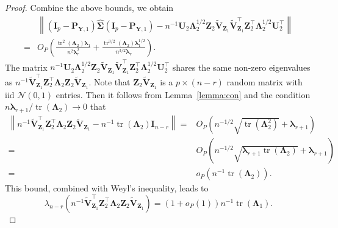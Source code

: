 \documentclass[12pt]{article} %
\DeclareMathOperator{\mytr}{tr}
\newcommand{\bZ}{\mathbf{Z}}
\newcommand{\bP}{\mathbf{P}}
\newcommand{\bY}{\mathbf{Y}}
\newcommand{\bI}{\mathbf{I}}
\newcommand{\bU}{\mathbf{U}}
\newcommand{\bV}{\mathbf{V}}
\newcommand{\bfsym}[1]{\ensuremath{\boldsymbol{#1}}}
\def\blambda {\bfsym {\lambda}}
\def\bLambda {\bfsym {\Lambda}}
\def\bSigma {\bfsym {\Sigma}}
\theoremstyle{definition}
\begin{document}
\begin{appendices}
\begin{proof}
    Combine the above bounds, we obtain
    \begin{equation}\label{haoqilai1}
        \begin{split}
             &\left\|(\bI_p -\bP_{\bY,1})\hat{\bSigma}(\bI_p -\bP_{\bY,1})
             -
         n^{-1}\bU_2 \bLambda_2^{1/2} \bZ_2 \tilde{\bV}_{\bZ_1}\tilde{\bV}_{\bZ_1}^\top  \bZ_2^\top \bLambda_2^{1/2} \bU_2^\top
             \right\|
             \\
             =&
             O_P\left(
                    \frac{\mytr^2(\bLambda_2)\blambda_1}{n^2 \blambda_r^2}
                 +
                 \frac{\mytr^{3/2}(\bLambda_2)\blambda_1^{1/2}}{n^{3/2}\blambda_r}
                \right).
        \end{split}
    \end{equation}
    The matrix $n^{-1}\bU_2 \bLambda_2^{1/2} \bZ_2 \tilde{\bV}_{\bZ_1}\tilde{\bV}_{\bZ_1}^\top  \bZ_2^\top \bLambda_2^{1/2} \bU_2^\top$ shares the same non-zero eigenvalues as $n^{-1} \tilde{\bV}_{\bZ_1}^\top\bZ_2^\top\bLambda_2 \bZ_2 \tilde{\bV}_{\bZ_1}$.
    Note that $\bZ_{2}\tilde{\bV}_{\bZ_1}$ is a $p\times (n-r)$ random matrix with iid $\mathcal{N}(0,1)$ entries.
    Then it follows from Lemma~\ref{lemma:con} and the condition $n\blambda_{r+1}/\mytr(\bLambda_2)\to 0$ that
    \begin{equation}\label{choc8}
        \begin{split}
        \left\|
        n^{-1} \tilde{\bV}_{\bZ_1}^\top\bZ_2^\top\bLambda_2 \bZ_2 \tilde{\bV}_{\bZ_1}-n^{-1}\mytr(\bLambda_2)\bI_{n-r}
        \right\|
        =&O_P\left(n^{-1/2}\sqrt{\mytr(\bLambda_2^2)}+\blambda_{r+1}\right)
        \\
        = &
        O_P\left(n^{-1/2}\sqrt{\blambda_{r+1}\mytr(\bLambda_2)}+\blambda_{r+1}\right)
        \\
        =& o_P\left(n^{-1}\mytr(\bLambda_2)\right).
        \end{split}
    \end{equation}
    This bound, combined with Weyl's inequality, leads to
    \begin{equation}\label{haoqilai2}
        \lambda_{n-r}\left(
            n^{-1} \tilde{\bV}_{\bZ_1}^\top\bZ_2^\top\bLambda_2 \bZ_2 \tilde{\bV}_{\bZ_1}   
        \right)
        =(1+o_P(1))n^{-1}\mytr(\bLambda_1).
    \end{equation}

\end{proof}
\end{appendices}
\end{document}
